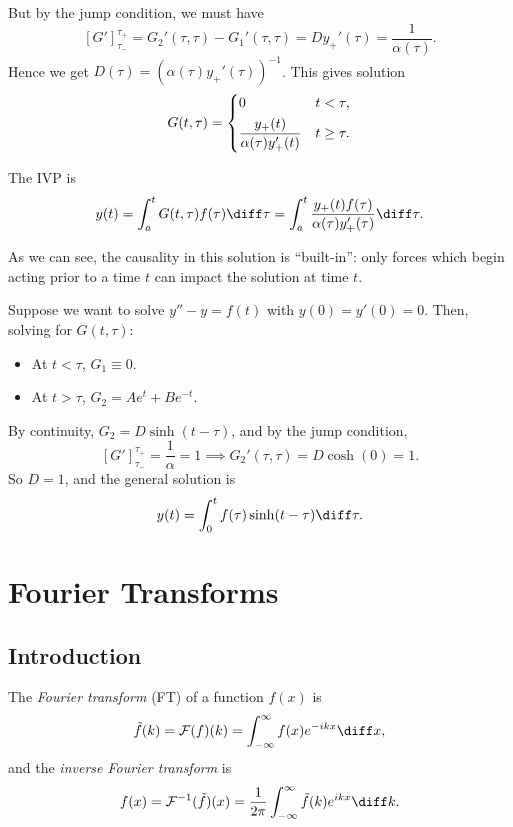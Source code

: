 \documentclass[12pt]{article}
\begin{document}
But by the jump condition, we must have
\[
	[G']_{\tau_{-}}^{\tau_{+}} = G_2'(\tau, \tau) - G_1'(\tau, \tau) = D y_{+}'(\tau) = \frac{1}{\alpha(\tau)}
.\]
Hence we get $D(\tau) = (\alpha(\tau)y_{+}'(\tau))^{-1}$. This gives solution
\[
	G(t, \tau) =
	\begin{dcases}
		0 & t < \tau, \\
		\frac{y_{+}(t)}{\alpha(\tau) y_{+}'(t)} & t \geq \tau.
	\end{dcases}
\]

The IVP is
\[
	y(t) = \int_{a}^{t}G(t, \tau) f(\tau) \diff \tau = \int_{a}^{t} \frac{y_{+}(t) f(\tau)}{\alpha(\tau) y_{+}'(\tau)} \diff \tau
.\]

As we can see, the causality in this solution is ``built-in'': only forces which begin acting prior to a time $t$ can impact the solution at time $t$.

\begin{exbox}
	Suppose we want to solve $y'' - y = f(t)$ with $y(0) = y'(0) = 0$. Then, solving for $G(t, \tau)$:
	\begin{itemize}
		\item At $t < \tau$, $G_1 \equiv 0$.
		\item At $t > \tau$, $G_2 = Ae^{t} + Be^{-t}$.
	\end{itemize}
	By continuity, $G_2 = D \sinh(t - \tau)$, and by the jump condition,
	\[
		[G']_{\tau_{-}}^{\tau_{+}} = \frac{1}{\alpha} = 1 \implies G_2'(\tau, \tau) = D \cosh(0) = 1
	.\]
	So $D = 1$, and the general solution is
	\[
		y(t) = \int_{0}^{t}f(\tau) \sinh (t - \tau) \diff \tau
	.\]
\end{exbox}

\newpage

\section{Fourier Transforms}%
\label{sec:fourier_transforms}

\subsection{Introduction}%
\label{sub:introduction}

\begin{definition}
	The \textit{Fourier transform} (FT) of a function $f(x)$ is
	\[
		\tilde f(k) = \mathcal{F}(f)(k) = \int_{-\infty}^{\infty}f(x) e^{-ikx}\diff x
	,\]
	and the \textit{inverse Fourier transform} is
	\[
		f(x) = \mathcal{F}^{-1}(\tilde f)(x) = \frac{1}{2\pi} \int_{-\infty}^{\infty} \tilde f(k) e^{ikx}\diff k
	.\]
\end{definition}
\end{document}
